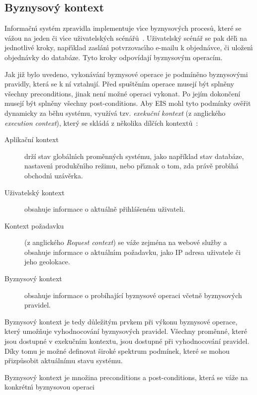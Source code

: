 \subsection{Byznysov\'y kontext}

Informačn\'{\i} systém zpravidla implementuje v\'{\i}ce byznysov\'ych procesů, které se vážou
na jeden či v\'{\i}ce uživatelsk\'ych scénářů~\cite{larman2001patterns}. Uživatelsk\'y scénář se
pak děl\'{\i} na jednotlivé kroky, např\'{\i}klad zaslán\'{\i} potvrzovac\'{\i}ho e-mailu k objednávce,
či uložen\'{\i} objednávky do databáze. Tyto kroky odpovídají byznysovým operacím.

Jak již bylo uvedeno, vykonávání byznysové operace je podmíněno byznysovými pravidly, která se k ní vztahují. Před spuštěním operace musejí
být splněny všechny preconditions, jinak není možné operaci vykonat. Po jejím dokončení musejí být splněny všechny post-conditions.
Aby \gls{EIS} mohl tyto podmínky ověřit dynamicky za běhu systému, využívá tzv. \textit{exekuční kontext} (z anglického
\textit{execution context}), který se skládá z několika dílčích kontextů~\cite{cemus2017separation}:

\begin{description}
    \item[Aplikační kontext] drží stav globáln\'{\i}ch proměnn\'ych systému, jako například stav databáze,
    nastaven\'{\i} produkčn\'{\i}ho režimu, nebo př\'{\i}znak o tom, zda právě prob\'{\i}há obchodn\'{\i} uzávěrka.
    \item[Uživatelský kontext] obsahuje informace o aktuálně přihlášeném uživateli.
    \item[Kontext požadavku] (z anglického \textit{Request context}) se váže zejména na webové služby a obsahuje
    informace o aktuáln\'{\i}m požadavku, jako IP adresa uživatele či jeho geolokace.
    \item[Byznysov\'y kontext] obsahuje informace o probíhající byznysové operaci včetně byznysových pravidel.
\end{description}

Byznysový kontext je tedy důležitým prvkem při výkonu byznysové operace, který umožňuje vyhodnocování byznysových pravidel.
Všechny proměnné, které jsou dostupné v exekučním kontextu, jsou dostupné při vyhodnocování pravidel. Díky tomu je možné
definovat široké spektrum podmínek, které se mohou přizpůsobit aktuálnímu stavu systému.

\begin{definition}
    Byznysový kontext je množina preconditions a post-conditions, která se váže na konkrétn\'{\i} byznysovou
    operaci~\cite{cemus2015automated}
\end{definition}

